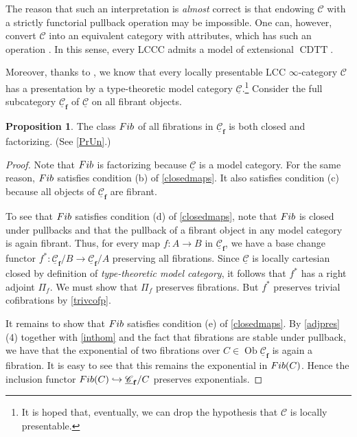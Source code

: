 \documentclass[10pt,letterpaper,cm]{nupset}
\theoremstyle{definition}
\theoremstyle{theorem}
\newtheorem{prop}[definition]{Proposition}
\theoremstyle{remark}
\DeclareMathOperator{\ob}{Ob}
\newcommand{\0}{\mathbf{0}}
\newcommand{\1}{\mathbf{1}}
\newcommand{\2}{\mathbf{2}}
\DeclareMathOperator{\cdtt}{\mathrm{CDTT}}
\renewcommand{\c}{\mathscr{C}}
\DeclareMathOperator{\fib}{\mathnormal{Fib}}
\begin{document}
The reason that such an interpretation is \emph{almost} correct is that endowing $\c$ with a strictly functorial pullback operation may be impossible. One can, however, convert $\c$ into an  equivalent category with attributes, which has such an operation \autocite{Hofmann}. In this sense, every LCCC admits a model of extensional $\cdtt$. 

\medskip

Moreover, thanks to \autocite[Theorem 7.10]{GK}, we know that every locally presentable LCC $\infty$-category $\c$ has a presentation by a type-theoretic model category $\underline{\c}$.\footnote{It is hoped that, eventually, we can drop the hypothesis that $\c$ is locally presentable.} Consider the full subcategory $\underline{\c}_{\mathbf{f}}$ of $\underline{\c}$ on all fibrant objects.

\begin{prop}\label{genmodel}
The class $\fib$ of all fibrations in $\underline{\c}_{\mathbf{f}}$ is both closed and factorizing. (See \cref{PrUn}.)
\end{prop}
\begin{proof}
Note that $\fib$ is factorizing because $\underline{\c}$ is a model category. For the same reason, $\fib$ satisfies condition (b) of \cref{closedmaps}. It also satisfies condition (c) because all objects of $\underline{\c}_{\mathbf{f}}$ are fibrant.

\medskip

To see that $\fib$ satisfies condition (d) of \cref{closedmaps}, note that $\fib$ is closed under pullbacks and that the pullback of a fibrant object in any model category is again fibrant. Thus, for every map $f: A \to B$ in $\underline{\c}_{\mathbf{f}}$, we have a base change functor $f^{\ast} : \underline{\c}_{\mathbf{f}}/B \to \underline{\c}_{\mathbf{f}}/A$ preserving all fibrations.  Since  $\underline{\c}$ is locally cartesian closed by definition of \textit{type-theoretic model category}, it follows that $f^{\ast}$ has a right adjoint $\Pi_f$. We must show that $\Pi_f$ preserves fibrations. But $f^{\ast}$ preserves trivial cofibrations by \cref{trivcofp}.

\medskip

It remains to show that $\fib$ satisfies condition (e) of \cref{closedmaps}. By \cref{adjpres}(4) together with  \cref{inthom} and the fact that fibrations are stable under pullback, we have that the exponential of two fibrations over $C\in \ob{\underline{\c}_{\mathbf{f}}}$ is again a fibration. It is easy to see that this remains the exponential in $\fib(C)$.  Hence the inclusion functor $\fib(C) \hookrightarrow \underline{\c}_{\mathbf{f}}/C$ preserves exponentials.
\end{proof}
\end{document}
